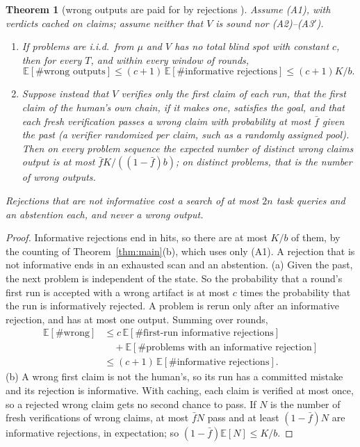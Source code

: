 \documentclass[11pt]{article}
\newtheorem{theorem}{Theorem}[section]
\theoremstyle{definition}
\theoremstyle{remark}
\newcommand{\K}{K}
\newcommand{\Ex}{\mathbb{E}}
\begin{document}
\begin{theorem}[wrong outputs are paid for by rejections \cite{threadQ2}]\label{thm:blindspot}
Assume (A1), with verdicts cached on claims; assume neither that $V$ is sound nor (A2)--(A3$'$).
\begin{enumerate}[label=(\alph*),nosep]
\item If problems are i.i.d.\ from $\mu$ and $V$ has no total blind spot with constant $c$, then for every $T$, and within every window of rounds,
\[\Ex[\#\text{wrong outputs}]\le(c+1)\,\Ex[\#\text{informative rejections}]\le(c+1)\K/b.\]
\item Suppose instead that $V$ verifies only the first claim of each run, that the first claim of the human's own chain, if it makes one, satisfies the goal, and that each fresh verification passes a wrong claim with probability at most $\bar f$ given the past (a verifier randomized per claim, such as a randomly assigned pool). Then on every problem sequence the expected number of distinct wrong claims output is at most $\bar f\K/((1-\bar f)b)$; on distinct problems, that is the number of wrong outputs.
\end{enumerate}
Rejections that are not informative cost a search of at most $2n$ task queries and an abstention each, and never a wrong output.
\end{theorem}
\begin{proof}
Informative rejections end in hits, so there are at most $\K/b$ of them, by the counting of Theorem~\ref{thm:main}(b), which uses only (A1). A rejection that is not informative ends in an exhausted scan and an abstention.
(a) Given the past, the next problem is independent of the state. So the probability that a round's first run is accepted with a wrong artifact is at most $c$ times the probability that the run is informatively rejected. A problem is rerun only after an informative rejection, and has at most one output. Summing over rounds,
\begin{align*}\Ex[\#\text{wrong}]&\le c\,\Ex[\#\text{first-run informative rejections}]\\&\quad+\Ex[\#\text{problems with an informative rejection}]\\&\le(c+1)\,\Ex[\#\text{informative rejections}].\end{align*}
(b) A wrong first claim is not the human's, so its run has a committed mistake and its rejection is informative. With caching, each claim is verified at most once, so a rejected wrong claim gets no second chance to pass. If $N$ is the number of fresh verifications of wrong claims, at most $\bar fN$ pass and at least $(1-\bar f)N$ are informative rejections, in expectation; so $(1-\bar f)\Ex[N]\le\K/b$.
\end{proof}
\end{document}
